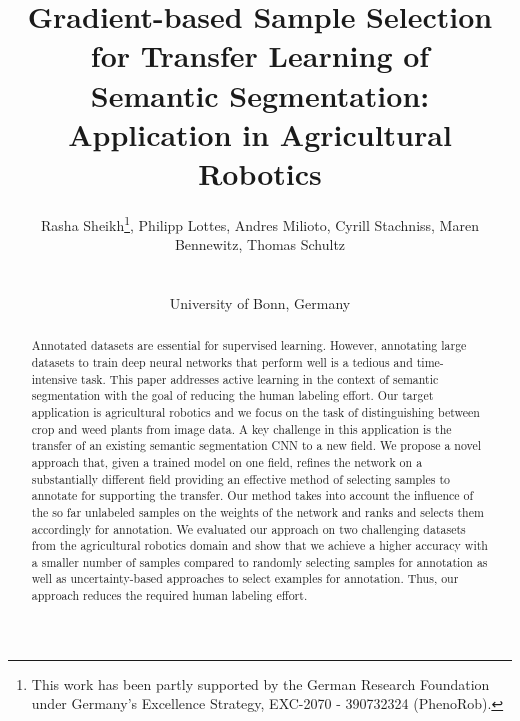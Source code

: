 
\usepackage{amsmath}
\usepackage{amssymb}
\usepackage{makecell}
\usepackage{subcaption}
\usepackage{booktabs}


\newcommand\etal{\emph{et~al.}}

\title{Gradient-based Sample Selection for Transfer Learning of\\ Semantic Segmentation: Application in Agricultural Robotics}

\author[Rasha Sheikh et al.]{\parbox{\textwidth}{\centering Rasha Sheikh\thanks{This work has been partly supported by the German Research Foundation under Germany's Excellence Strategy, EXC-2070 - 390732324 (PhenoRob).}, Philipp Lottes, Andres Milioto, Cyrill Stachniss, Maren Bennewitz, Thomas Schultz}
\\
{\parbox{\textwidth}{\centering  University of Bonn, Germany}
}
}



\maketitle

\begin{abstract}
Annotated datasets are essential for supervised learning. However, annotating
large datasets to  train deep neural networks that perform well is a tedious
and time-intensive task. This paper  addresses active learning in the context
of semantic segmentation with the goal of reducing the  human labeling effort.
Our target application is agricultural robotics and we focus on the task of
distinguishing between crop and weed plants from image data. A key challenge in this
application is the  transfer of an existing semantic segmentation CNN to a new
field. We propose a novel approach that, given a trained model on one field,
refines the network on a substantially different field  providing an effective
method of selecting samples to annotate for supporting the transfer. Our
method takes into account the influence of the so far unlabeled samples on the
weights of the network and  ranks and selects them accordingly for annotation.
We evaluated our approach on two challenging  datasets from the agricultural
robotics domain and show that we achieve a higher accuracy with a  smaller
number of samples compared to randomly selecting samples for annotation as well as
uncertainty-based  approaches to select examples for annotation. Thus, our
approach reduces the required human labeling  effort.

\end{abstract} 

